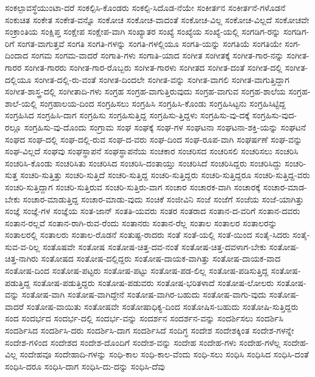 {ಸಂಕಲ್ಪಾವಸ್ಥೆಯುಂಟಾ-ದರೆ
ಸಂಕಲ್ಪಿಸಿ-ಕೊಂಡರು
ಸಂಕಲ್ಪಿ-ಸಿದೊಡ-ನೆಯೇ
ಸಂಕೀರ್ತನ
ಸಂಕೀರ್ತನೆ-ಗಳೊಡನೆ
ಸಂಕುಚಿತ
ಸಂಕೇತ
ಸಂಕೇತ-ವನ್ನೊ
ಸಂಕೋಚ
ಸಂಕೋಚ-ವಾದಂತೆ
ಸಂಕೋಚ-ವಿಲ್ಲ
ಸಂಕೋಚ-ವಿಲ್ಲದೆ
ಸಂಕೋಚವೇ
ಸಂಕ್ರಾಂತಿಯ
ಸಂಕ್ಷಿಪ್ತ
ಸಂಕ್ಷೇಪ
ಸಂಕ್ಷೇಪ-ವಾಗಿ
ಸಂಖ್ಯಾತರ
ಸಂಖ್ಯೆ
ಸಂಖ್ಯೆಯ
ಸಂಖ್ಯೆ-ಯಲ್ಲಿ
ಸಂಗಡಿಗ-ರನ್ನು
ಸಂಗಡಿಗ-ರಿಗೆ
ಸಂಗತ-ವಾಗುತ್ತವೆ
ಸಂಗತಿ
ಸಂಗತಿ-ಗಳನ್ನು
ಸಂಗತಿ-ಗಳಲ್ಲಿಯೂ
ಸಂಗತಿ-ಯನ್ನು
ಸಂಗತಿಯೆ
ಸಂಗತಿಯೇ
ಸಂಗ-ದಿಂದಾದ
ಸಂಗಮ
ಸಂಗಮ-ವಾದರೆ
ಸಂಗಾತಿ-ಗಳು
ಸಂಗಾತಿ-ಯಾದ
ಸಂಗೀತ
ಸಂಗೀತಕ್ಕೆ
ಸಂಗೀತ-ಗಾರ-ನನ್ನು
ಸಂಗೀತ-ಗಾರರ
ಸಂಗೀತ-ಗಾರರು
ಸಂಗೀತ-ಗಾರ-ರೊಬ್ಬರು
ಸಂಗೀತ-ಗಾರಳು
ಸಂಗೀತದ
ಸಂಗೀತ-ದಂತೆ
ಸಂಗೀತ-ದಲ್ಲಿ
ಸಂಗೀತ-ದಲ್ಲಿಯೂ
ಸಂಗೀತ-ದಲ್ಲಿ-ರು-ವಂತೆ
ಸಂಗೀತ-ದಿಂದಲೇ
ಸಂಗೀತ-ವನ್ನು
ಸಂಗೀತ-ವಾಗಲಿ
ಸಂಗೀತ-ವಾಗುತ್ತಿದ್ದಾಗ
ಸಂಗೀತ-ಶಾಸ್ತ್ರ-ದಲ್ಲಿ
ಸಂಗೀತಾದಿ-ಗಳು
ಸಂಗ್ರಹ
ಸಂಗ್ರಹ-ವಾಗುತ್ತಿರುವುದು
ಸಂಗ್ರಹ-ವಾಗುವ
ಸಂಗ್ರಹ-ಶಾಲೆಯ
ಸಂಗ್ರಹ-ಶಾಲೆ-ಯಲ್ಲಿ
ಸಂಗ್ರಹಾಲಯ-ದಿಂದ
ಸಂಗ್ರಹಿಸಲು
ಸಂಗ್ರಹಿಸಿ
ಸಂಗ್ರಹಿಸಿ-ಕೊಂಡು
ಸಂಗ್ರಹಿಸಿಟ್ಟನು
ಸಂಗ್ರಹಿಸಿಟ್ಟಿದ್ದ
ಸಂಗ್ರಹಿಸಿದ
ಸಂಗ್ರಹಿಸಿ-ದಾಗ
ಸಂಗ್ರಹಿಸು
ಸಂಗ್ರಹಿಸುತ್ತಿದ್ದ
ಸಂಗ್ರಹಿಸು-ತ್ತಿದ್ದಳು
ಸಂಗ್ರಹಿಸು-ವು-ದಕ್ಕೆ
ಸಂಗ್ರಹಿಸು-ವುದ-ರಲ್ಲೂ
ಸಂಗ್ರಹಿಸು-ವು-ದೊಂದು
ಸಂಗ್ರಾಮ
ಸಂಘ
ಸಂಘಕ್ಕೆ
ಸಂಘ-ಗಳ
ಸಂಘಟನಾ
ಸಂಘಟನಾ-ಶಕ್ತಿ-ಯನ್ನು
ಸಂಘಟನೆ
ಸಂಘದ
ಸಂಘ-ದಲ್ಲಿ
ಸಂಘ-ದಲ್ಲಿ-ರುವ
ಸಂಘ-ದ-ವರು
ಸಂಘ-ದಿಂದ
ಸಂಘ-ರೂಪ-ವಾಗಿ
ಸಂಘರ್ಷಣೆ
ಸಂಘ-ವನ್ನು
ಸಂಘ-ವಿಲ್ಲದೆ
ಸಂಘವು
ಸಂಘಸ್ಥಾಪನೆ
ಸಂಘಸ್ಥಾಪನೆಯ
ಸಂಚಕಾರ
ಸಂಚರಿಸದ
ಸಂಚರಿಸಲಿ
ಸಂಚರಿಸಲು
ಸಂಚರಿಸಿ
ಸಂಚರಿಸಿ-ಕೊಂಡು
ಸಂಚರಿಸಿತು
ಸಂಚರಿಸಿದ
ಸಂಚರಿಸಿ-ದಂತಾಯ್ತು
ಸಂಚರಿಸಿದೆ
ಸಂಚರಿಸಿದ್ದರು
ಸಂಚರಿಸಿದ್ದು
ಸಂಚರಿ-ಸುತ್ತ
ಸಂಚರಿ-ಸುತ್ತಿತ್ತು
ಸಂಚರಿ-ಸುತ್ತಿದೆ
ಸಂಚರಿ-ಸುತ್ತಿದ್ದ
ಸಂಚರಿ-ಸುತ್ತಿದ್ದರು
ಸಂಚರಿ-ಸುತ್ತಿದ್ದರೂ
ಸಂಚರಿ-ಸುತ್ತಿದ್ದ-ವರು
ಸಂಚರಿ-ಸುತ್ತಿದ್ದಾಗ
ಸಂಚರಿ-ಸುತ್ತಿರುವ
ಸಂಚರಿ-ಸುತ್ತಿರು-ವಾಗ
ಸಂಚಾರ
ಸಂಚಾರಕ-ವಾಗಿ
ಸಂಚಾರಕ್ಕೆ
ಸಂಚಾರ-ಮಾಡ-ಬೇಕು
ಸಂಚಾರ-ಮಾಡುತ್ತಿದ್ದ
ಸಂಚಾರ-ಮಾಡು-ವುದು
ಸಂಚಿಕೆ
ಸಂಜೀವಿನಿ
ಸಂಜೆ
ಸಂಜೆಗೆ
ಸಂಜೆಯ
ಸಂಜೆ-ಯಾಗಿತ್ತು
ಸಂಜ್ಞೆ
ಸಂಜ್ಞೆ-ಗಳ
ಸಂಜ್ಞೆಯ
ಸಂತ-ಜಾನ್
ಸಂತತಿ-ಯವರು
ಸಂತರ
ಸಂತರಾದ
ಸಂತಾನ-ದ-ವರಿಗೆ
ಸಂತಾನ-ದವರು
ಸಂತಾನ-ರಲ್ಲವೆ
ಸಂತಾನ-ರಾಗಿ-ರುವ-ರೆಂದು
ಸಂತಾನರು
ಸಂತಾನ-ರೆಲ್ಲ
ಸಂತಾಲ
ಸಂತಾಲರ
ಸಂತಾಲರನ್ನು
ಸಂತಾಲರಲ್ಲಿ
ಸಂತಾಲರು
ಸಂತಾಲ-ರೊಡನೆ
ಸಂತುಷ್ಟ-ರಾದರು
ಸಂತೆ
ಸಂತೆ-ಯಲ್ಲಿ
ಸಂತೆ-ಯಿಂದ
ಸಂತೈ-ಸಿದರು
ಸಂತೈ-ಸುವ-ವ-ರಿಲ್ಲ
ಸಂತೊಷವೇ
ಸಂತೋಷ
ಸಂತೋಷ-ಚಿತ್ತ-ದವ-ನಂತೆ
ಸಂತೋಷ-ಚಿತ್ತ-ದವಳಾಗ-ಬೇಕು
ಸಂತೋಷ-ಚಿತ್ತ-ನಾಗಿರು
ಸಂತೋಷದ
ಸಂತೋಷ-ದಲ್ಲಿದ್ದರು
ಸಂತೋಷ-ದಾಯಕ-ವಾಗಿತ್ತು
ಸಂತೋಷ-ದಾಯಕ-ವಾದ
ಸಂತೋಷ-ದಿಂದ
ಸಂತೋಷ-ಪಟ್ಟರು
ಸಂತೋಷ-ಪಟ್ಟು
ಸಂತೋಷ-ಪಡ-ಲಿಲ್ಲ
ಸಂತೋಷ-ಪಡಿಸುತ್ತಿದ್ದ
ಸಂತೋಷ-ಪಡುತ್ತಿದ್ದ
ಸಂತೋಷ-ಪಡುತ್ತಿದ್ದರು
ಸಂತೋಷ-ಪಡುವರು
ಸಂತೋಷ-ಭರಿತಳಾದೆ
ಸಂತೋಷ-ಲೋಲರು
ಸಂತೋಷ-ವನ್ನು
ಸಂತೋಷ-ವಾಗಿ
ಸಂತೋಷ-ವಾಗಿದ್ದೇನೆ
ಸಂತೋಷ-ವಾಗಿರ-ಬಹುದು
ಸಂತೋಷ-ವಾಗು-ವುದು
ಸಂತೋಷ-ವಾದರೆ
ಸಂತೋಷ-ವಾಯಿತು
ಸಂತೋಷವೇ
ಸಂತೋಷಾಧಿಕ್ಯ-ದಿಂದ
ಸಂತೋಷಿಸ-ಬಹುದು
ಸಂತೋಷಿ-ಸುತ್ತಿದ್ದರು
ಸಂದ
ಸಂದರ್ಭದ
ಸಂದರ್ಭ-ದಲ್ಲಿ
ಸಂದರ್ಭ-ವನ್ನು
ಸಂದರ್ಶನ
ಸಂದರ್ಶನ-ವನ್ನು
ಸಂದರ್ಶಿಸಲು
ಸಂದರ್ಶಿಸಿ
ಸಂದರ್ಶಿಸಿದ
ಸಂದರ್ಶಿಸಿ-ದರು
ಸಂದರ್ಶಿಸಿ-ದಾಗ
ಸಂದರ್ಶಿಸಿದೆ
ಸಂದಿಗ್ಧ
ಸಂದೇಶ
ಸಂದೇಶಕ್ಕಿಂತ
ಸಂದೇಶ-ಗಳನ್ನೇ
ಸಂದೇಶ-ಗಳಿಂದ
ಸಂದೇಶದ
ಸಂದೇಶ-ದೊಂದಿಗೆ
ಸಂದೇಶ-ವನ್ನು
ಸಂದೇಹ
ಸಂದೇಹ-ಗಳು
ಸಂದೇಹ-ಗಳೆಲ್ಲ
ಸಂದೇಹ-ವಿಲ್ಲ
ಸಂದೇಹವೂ
ಸಂದೇಹಾದಿ-ಗಳನ್ನು
ಸಂಧಿ-ಕಾಲ
ಸಂಧಿ-ಕಾಲ-ವೆಂದು
ಸಂಧಿ-ಸಲು
ಸಂಧಿಸಿ
ಸಂಧಿಸಿದ
ಸಂಧಿಸಿ-ದಂತೆ
ಸಂಧಿಸಿ-ದರೂ
ಸಂಧಿಸಿ-ದಾಗ
ಸಂಧಿಸಿ-ದು-ದನ್ನು
ಸಂಧಿಸಿ-ದೆವು
}
